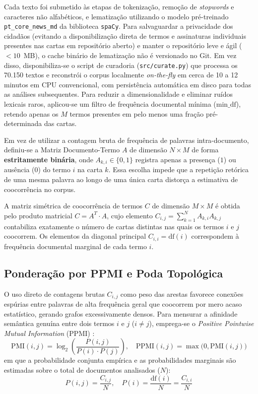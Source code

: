 \documentclass[12pt]{article}
\begin{document}
Cada texto foi submetido às etapas de tokenização, remoção de \textit{stopwords} e caracteres não alfabéticos, e lematização \cite{hotho2005,tan1999} utilizando o modelo pré-treinado \texttt{pt\_core\_news\_md} da biblioteca \texttt{spaCy}. Para salvaguardar a privacidade dos cidadãos (evitando a disponibilização direta de termos e assinaturas individuais presentes nas cartas em repositório aberto) e manter o repositório leve e ágil ($< 10$~MB), o cache binário de lematização não é versionado no Git. Em vez disso, disponibiliza-se o script de curadoria (\texttt{src/curate.py}) que processa os 70.150 textos e reconstrói o corpus localmente \textit{on-the-fly} em cerca de 10 a 12 minutos em CPU convencional, com persistência automática em disco para todas as análises subsequentes. Para reduzir a dimensionalidade e eliminar ruídos lexicais raros, aplicou-se um filtro de frequência documental mínima ($\text{min\_df}$), retendo apenas os $M$ termos presentes em pelo menos uma fração pré-determinada das cartas.

Em vez de utilizar a contagem bruta de frequência de palavras intra-documento, definiu-se a Matriz Documento-Termo $A$ de dimensão $N \times M$ de forma \textbf{estritamente binária}, onde $A_{k,i} \in \{0, 1\}$ registra apenas a presença ($1$) ou ausência ($0$) do termo $i$ na carta $k$. Essa escolha impede que a repetição retórica de uma mesma palavra ao longo de uma única carta distorça a estimativa de coocorrência no corpus.

A matriz simétrica de coocorrência de termos $C$ de dimensão $M \times M$ é obtida pelo produto matricial $C = A^T \cdot A$, cujo elemento $C_{i,j} = \sum_{k=1}^{N} A_{k,i} A_{k,j}$ contabiliza exatamente o número de cartas distintas nas quais os termos $i$ e $j$ coocorrem. Os elementos da diagonal principal $C_{i,i} = \text{df}(i)$ correspondem à frequência documental marginal de cada termo $i$.

\subsection{Ponderação por PPMI e Poda Topológica}

O uso direto de contagens brutas $C_{i,j}$ como peso das arestas favorece conexões espúrias entre palavras de alta frequência geral que coocorrem por mero acaso estatístico, gerando grafos excessivamente densos. Para mensurar a afinidade semântica genuína entre dois termos $i$ e $j$ ($i \neq j$), emprega-se o \textit{Positive Pointwise Mutual Information} (PPMI) \cite{church1990}:
\begin{equation}
\text{PMI}(i, j) = \log_2 \left( \frac{P(i, j)}{P(i) \cdot P(j)} \right), \quad \text{PPMI}(i, j) = \max\big(0, \text{PMI}(i, j)\big)
\end{equation}
em que a probabilidade conjunta empírica e as probabilidades marginais são estimadas sobre o total de documentos analisados ($N$):
\begin{equation}
P(i, j) = \frac{C_{i, j}}{N}, \quad P(i) = \frac{\text{df}(i)}{N} = \frac{C_{i, i}}{N}
\end{equation}
\end{document}
